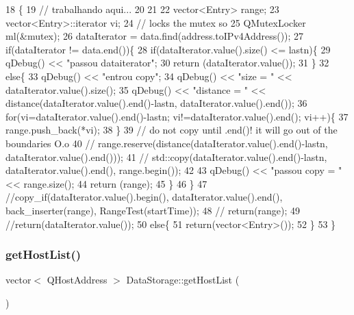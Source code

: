 \begin{DoxyCode}
18                                                                           \{
19   \textcolor{comment}{// trabalhando aqui...}
20 
21 
22   vector<Entry> range;
23   vector<Entry>::iterator vi;
24   \textcolor{comment}{// locks the mutex so}
25   QMutexLocker ml(&mutex);
26   dataIterator = data.find(address.toIPv4Address());
27   \textcolor{keywordflow}{if}(dataIterator != data.end())\{
28     \textcolor{keywordflow}{if}(dataIterator.value().size() <= lastn)\{
29       qDebug() << \textcolor{stringliteral}{"passou dataiterator"};
30       \textcolor{keywordflow}{return} (dataIterator.value());
31     \}
32     \textcolor{keywordflow}{else}\{
33       qDebug() << \textcolor{stringliteral}{"entrou copy"};
34       qDebug() << \textcolor{stringliteral}{"size = "} << dataIterator.value().size();
35       qDebug() << \textcolor{stringliteral}{"distance = "} << distance(dataIterator.value().end()-lastn, dataIterator.value().end());
36       \textcolor{keywordflow}{for}(vi=dataIterator.value().end()-lastn; vi!=dataIterator.value().end(); vi++)\{
37         range.push\_back(*vi);
38       \}
39       \textcolor{comment}{// do not copy until .end()! it will go out of the boundaries O.o}
40      \textcolor{comment}{// range.reserve(distance(dataIterator.value().end()-lastn, dataIterator.value().end()));}
41      \textcolor{comment}{// std::copy(dataIterator.value().end()-lastn, dataIterator.value().end(), range.begin());}
42 
43       qDebug() << \textcolor{stringliteral}{"passou copy = "} << range.size();
44       \textcolor{keywordflow}{return} (range);
45     \}
46   \}
47   \textcolor{comment}{//copy\_if(dataIterator.value().begin(), dataIterator.value().end(), back\_inserter(range),
       RangeTest(startTime));}
48   \textcolor{comment}{// return(range);}
49   \textcolor{comment}{//return(dataIterator.value());}
50   \textcolor{keywordflow}{else}\{
51       \textcolor{keywordflow}{return}(vector<Entry>());
52   \}
53 \}
\end{DoxyCode}
\mbox{\label{class_data_storage_a05e60f4e62fb68f588e3f381d40b6bbd}} 
\subsubsection{\texorpdfstring{get\+Host\+List()}{getHostList()}}
{\footnotesize\ttfamily vector$<$ Q\+Host\+Address $>$ Data\+Storage\+::get\+Host\+List (\begin{DoxyParamCaption}{ }\end{DoxyParamCaption})}


